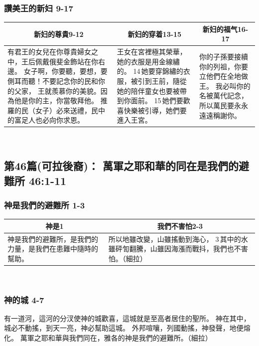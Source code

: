 \subsubsection{讚美王的新妇 9-17}
\begin{table}[H]
\centering
\begin{tabular}{p{7.75cm}|p{5.25cm}|p{3.5cm}}\hline\hline
\multicolumn{1}{c|}{新妇的尊貴9-12}&\multicolumn{1}{c}{新妇的穿着13-15}&\multicolumn{1}{c}{新妇的福气16-17}\\\hline
有君王的女兒在你尊貴婦女之中，王后佩戴俄斐金飾站在你右邊。
女子啊，你要聽，要想，要側耳而聽！不要記念你的民和你的父家，
王就羨慕你的美貌。因為他是你的主，你當敬拜他。
推羅的民（女子）必來送禮，民中的富足人也必向你求恩。
&王女在宮裡極其榮華，她的衣服是用金線繡的。
14 她要穿錦繡的衣服，被引到王前，隨從她的陪伴童女也要被帶到你面前。
15 她們要歡喜快樂被引導，她們要進入王宮。
&你的子孫要接續你的列祖，你要立他們在全地做王。
我必叫你的名被萬代記念，所以萬民要永永遠遠稱謝你。\\\hline
\end{tabular}
\end{table} 


\subsection{第46篇(可拉後裔)： 萬軍之耶和華的同在是我們的避難所 46:1-11}
\subsubsection{神是我們的避難所 1-3}
\begin{table}[H]
\centering
\begin{tabular}{p{}|p{10.25cm}}\hline\hline
\multicolumn{1}{c|}{神是1}&\multicolumn{1}{c}{我們不害怕2-3}\\\hline
神是我們的避難所，是我們的力量，是我們在患難中隨時的幫助。
&所以地雖改變，山雖搖動到海心，
3 其中的水雖砰訇翻騰，山雖因海漲而戰抖，我們也不害怕。（細拉）\\\hline
\end{tabular}
\end{table} 

\subsubsection{神的城 4-7}
有一道河，這河的分汊使神的城歡喜，這城就是至高者居住的聖所。
神在其中，城必不動搖，到天一亮，神必幫助這城。
外邦喧嚷，列國動搖，神發聲，地便熔化。
萬軍之耶和華與我們同在，雅各的神是我們的避難所。（細拉）
